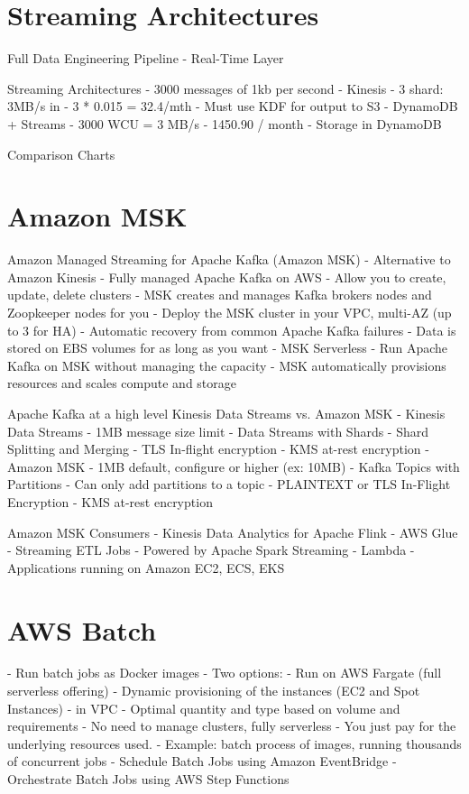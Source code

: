 \documentclass[11pt]{book}
\begin{document}
    \section{Streaming Architectures}
    Full Data Engineering Pipeline - Real-Time Layer

    Streaming Architectures - 3000 messages of 1kb per second
    - Kinesis
    -  3 shard: 3MB/s in
    - 3 * 0.015 = 32.4/mth
    - Must use KDF for output to S3
    - DynamoDB + Streams
    - 3000 WCU = 3 MB/s
    - 1450.90 / month
    - Storage in DynamoDB

    Comparison Charts

    \section{Amazon MSK}
    Amazon Managed Streaming for Apache Kafka (Amazon MSK)
    - Alternative to Amazon Kinesis
    - Fully managed Apache Kafka on AWS
        - Allow you to create, update, delete clusters
        - MSK creates and manages Kafka brokers nodes and Zoopkeeper nodes for you
        - Deploy the MSK cluster in your VPC, multi-AZ (up to 3 for HA)
        - Automatic recovery from common Apache Kafka failures
        - Data is stored on EBS volumes for as long as you want
    - MSK Serverless
        - Run Apache Kafka on MSK without managing the capacity
        - MSK automatically provisions resources and scales compute and storage

    Apache Kafka at a high level
    Kinesis Data Streams vs. Amazon MSK
    - Kinesis Data Streams
        - 1MB message size limit
        - Data Streams with Shards
        - Shard Splitting and Merging
        - TLS In-flight encryption
        - KMS at-rest encryption
    - Amazon MSK
        - 1MB default, configure or higher (ex: 10MB)
        - Kafka Topics with Partitions
        - Can only add partitions to a topic
        - PLAINTEXT or TLS In-Flight Encryption
        - KMS at-rest encryption

    Amazon MSK Consumers
    - Kinesis Data Analytics for Apache Flink
    - AWS Glue - Streaming ETL Jobs - Powered by Apache Spark Streaming
    - Lambda
    - Applications running on Amazon EC2, ECS, EKS

    \section{AWS Batch}
    - Run batch jobs as Docker images
    - Two options:
        - Run on AWS Fargate (full serverless offering)
        - Dynamic provisioning of the instances (EC2 and Spot Instances) - in VPC
    - Optimal quantity and type based on volume and requirements
    - No need to manage clusters, fully serverless
    - You just pay for the underlying resources used.
    - Example: batch process of images, running thousands of concurrent jobs
    - Schedule Batch Jobs using Amazon EventBridge
    - Orchestrate Batch Jobs using AWS Step Functions
\end{document}
